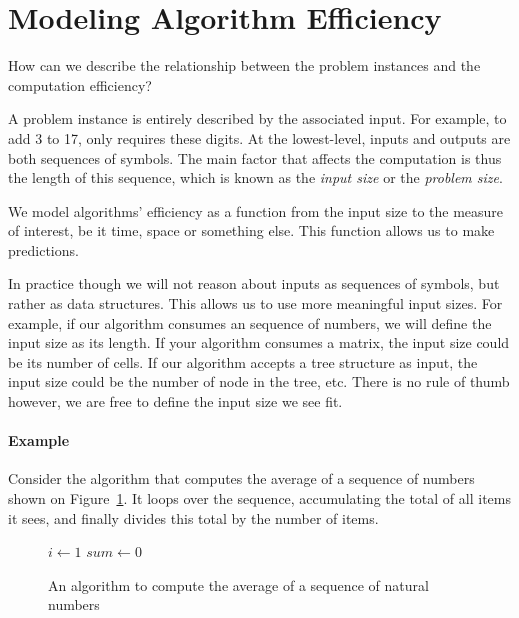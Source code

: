 \documentclass{aldast}
\begin{document}
\section{Modeling Algorithm Efficiency}

How can we describe the relationship between the problem instances and
the computation efficiency?

A problem instance is entirely described by the associated input. For
example, to add 3 to 17, only requires these digits. At the
lowest-level, inputs and outputs are both sequences of symbols. The
main factor that affects the computation is thus the length of this
sequence, which is known as the \emph{input size} or the \emph{problem
  size}.

\begin{takeaway}
  We model algorithms' efficiency as a function from the input size to
  the measure of interest, be it time, space or something else. This
  function allows us to make predictions.
\end{takeaway}

In practice though we will not reason about inputs as sequences of
symbols, but rather as data structures. This allows us to use more
meaningful input sizes. For example, if our algorithm consumes an
sequence of numbers, we will define the input size as its length. If
your algorithm consumes a matrix, the input size could be its number
of cells. If our algorithm accepts a tree structure as input, the
input size could be the number of node in the tree, etc. There is no
rule of thumb however, we are free to define the input size we see
fit.

\paragraph{Example}

Consider the algorithm that computes the average of a sequence of
numbers shown on Figure~\ref{alg:average}. It loops over the
sequence, accumulating the total of all items it sees, and finally
divides this total by the number of items.

\begin{figure}[htbp]
  \begin{algorithm}[H]
    $i \gets 1$\;
    $sum \gets 0$\;
    \;
  \end{algorithm}
  \caption{An algorithm to compute the average of a sequence of natural numbers}
  \label{alg:average}
\end{figure}
\end{document}
